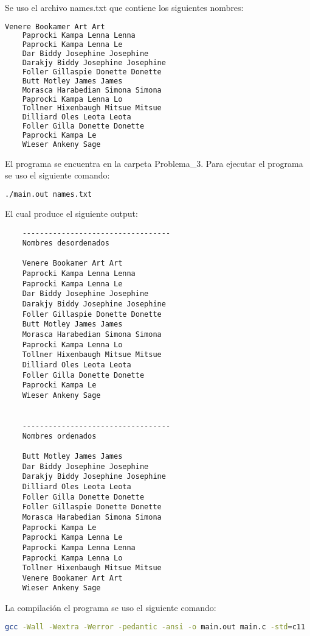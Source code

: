 Se uso el archivo \textcolor{citecolor}{names.txt} que contiene los siguientes nombres:

\begin{lstlisting}[language=bash]
    Venere Bookamer Art Art 
    Paprocki Kampa Lenna Lenna
    Paprocki Kampa Lenna Le
    Dar Biddy Josephine Josephine
    Darakjy Biddy Josephine Josephine
    Foller Gillaspie Donette Donette
    Butt Motley James James
    Morasca Harabedian Simona Simona
    Paprocki Kampa Lenna Lo
    Tollner Hixenbaugh Mitsue Mitsue
    Dilliard Oles Leota Leota
    Foller Gilla Donette Donette
    Paprocki Kampa Le
    Wieser Ankeny Sage
\end{lstlisting}

El programa se encuentra en la carpeta \textcolor{citecolor}{Problema\_3}. Para ejecutar el programa se uso el siguiente comando:

\begin{lstlisting}[language=bash]
    ./main.out names.txt
\end{lstlisting}

El cual produce el siguiente output:

\begin{lstlisting}
    ----------------------------------
    Nombres desordenados
    
    Venere Bookamer Art Art 
    Paprocki Kampa Lenna Lenna
    Paprocki Kampa Lenna Le
    Dar Biddy Josephine Josephine
    Darakjy Biddy Josephine Josephine
    Foller Gillaspie Donette Donette
    Butt Motley James James
    Morasca Harabedian Simona Simona
    Paprocki Kampa Lenna Lo
    Tollner Hixenbaugh Mitsue Mitsue
    Dilliard Oles Leota Leota
    Foller Gilla Donette Donette
    Paprocki Kampa Le
    Wieser Ankeny Sage
    
    
    ----------------------------------
    Nombres ordenados
    
    Butt Motley James James
    Dar Biddy Josephine Josephine
    Darakjy Biddy Josephine Josephine
    Dilliard Oles Leota Leota
    Foller Gilla Donette Donette
    Foller Gillaspie Donette Donette
    Morasca Harabedian Simona Simona
    Paprocki Kampa Le
    Paprocki Kampa Lenna Le
    Paprocki Kampa Lenna Lenna
    Paprocki Kampa Lenna Lo
    Tollner Hixenbaugh Mitsue Mitsue
    Venere Bookamer Art Art 
    Wieser Ankeny Sage
\end{lstlisting}

La compilación el programa se uso el siguiente comando:

\begin{lstlisting}[language=bash]
    gcc -Wall -Wextra -Werror -pedantic -ansi -o main.out main.c -std=c11
\end{lstlisting}